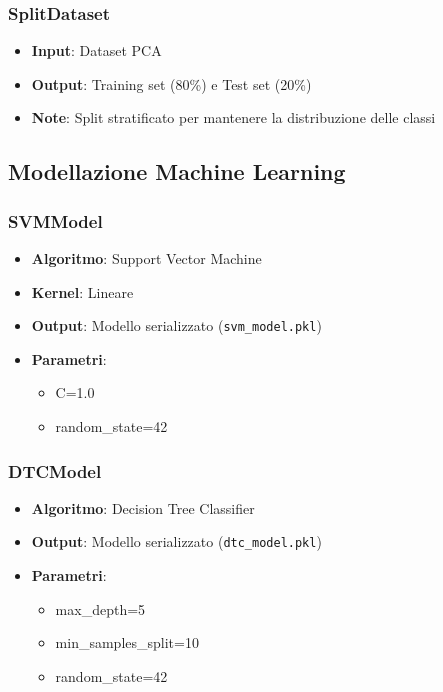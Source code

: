 \documentclass[a4paper, 12pt]{article}
\begin{document}
\subsubsection{SplitDataset}
\begin{itemize}
    \item \textbf{Input}: Dataset PCA
    \item \textbf{Output}: Training set (80\%) e Test set (20\%)
    \item \textbf{Note}: Split stratificato per mantenere la distribuzione delle classi
\end{itemize}

\subsection{Modellazione Machine Learning}

\subsubsection{SVMModel}
\begin{itemize}
    \item \textbf{Algoritmo}: Support Vector Machine
    \item \textbf{Kernel}: Lineare
    \item \textbf{Output}: Modello serializzato (\texttt{svm\_model.pkl})
    \item \textbf{Parametri}:
    \begin{itemize}
        \item C=1.0
        \item random\_state=42
    \end{itemize}
\end{itemize}

\subsubsection{DTCModel}
\begin{itemize}
    \item \textbf{Algoritmo}: Decision Tree Classifier
    \item \textbf{Output}: Modello serializzato (\texttt{dtc\_model.pkl})
    \item \textbf{Parametri}:
    \begin{itemize}
        \item max\_depth=5
        \item min\_samples\_split=10
        \item random\_state=42
    \end{itemize}
\end{itemize}
\end{document}
